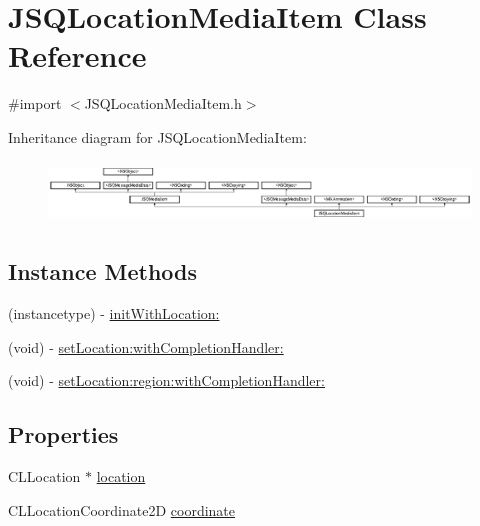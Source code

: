 \hypertarget{interface_j_s_q_location_media_item}{}\section{J\+S\+Q\+Location\+Media\+Item Class Reference}
\label{interface_j_s_q_location_media_item}


{\ttfamily \#import $<$J\+S\+Q\+Location\+Media\+Item.\+h$>$}

Inheritance diagram for J\+S\+Q\+Location\+Media\+Item\+:\begin{figure}[H]
\begin{center}
\leavevmode
\includegraphics[height=1.637427cm]{interface_j_s_q_location_media_item}
\end{center}
\end{figure}
\subsection*{Instance Methods}
\begin{DoxyCompactItemize}
\item 
(instancetype) -\/ \hyperlink{interface_j_s_q_location_media_item_a6917e2ed7962dc50fdc79c138d885946}{init\+With\+Location\+:}
\item 
(void) -\/ \hyperlink{interface_j_s_q_location_media_item_a1c491825c3f0bdd60618e07d4acc97c1}{set\+Location\+:with\+Completion\+Handler\+:}
\item 
(void) -\/ \hyperlink{interface_j_s_q_location_media_item_a77fbbf9fcc95e60be4f35bf7d695d91e}{set\+Location\+:region\+:with\+Completion\+Handler\+:}
\end{DoxyCompactItemize}
\subsection*{Properties}
\begin{DoxyCompactItemize}
\item 
C\+L\+Location $\ast$ \hyperlink{interface_j_s_q_location_media_item_afc1f1935469dc2b05605218f59fdb0a1}{location}
\item 
C\+L\+Location\+Coordinate2\+D \hyperlink{interface_j_s_q_location_media_item_a58c900c60211c297722242bce1769b00}{coordinate}
\end{DoxyCompactItemize}


